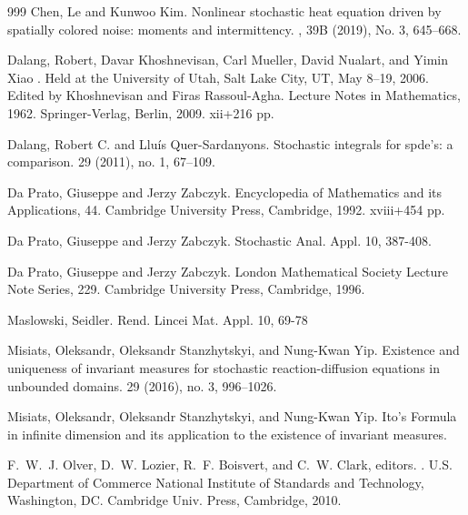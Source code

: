 \documentclass[a4paper,11pt]{article}
\numberwithin{equation}{section}
\theoremstyle{plain}
\theoremstyle{definition}
\begin{document}
\begin{small}
\begin{thebibliography}{999}
Chen, Le and Kunwoo Kim.
\newblock Nonlinear stochastic heat equation driven by spatially colored noise: moments and intermittency.
, 39B (2019), No. 3, 645--668.

 Dalang, Robert, Davar Khoshnevisan, Carl 
Mueller, David Nualart, and Yimin Xiao
.
\newblock Held at the University of Utah, Salt Lake City, UT, May 8–19, 2006. 
Edited by  Khoshnevisan and Firas Rassoul-Agha. Lecture Notes in Mathematics, 
1962.  
\newblock Springer-Verlag, Berlin, 2009. xii+216 pp.

Dalang, Robert C. and Llu\'is Quer-Sardanyons.
\newblock Stochastic integrals for spde's: a comparison.
 29 (2011), no. 1, 67--109. 

Da Prato, Giuseppe and Jerzy Zabczyk.
Encyclopedia of Mathematics and its Applications, 44. Cambridge University Press, Cambridge, 1992. xviii+454 pp.

Da Prato, Giuseppe and Jerzy Zabczyk.
Stochastic Anal. Appl. 10, 387-408.


Da Prato, Giuseppe and Jerzy Zabczyk.
\newblock London Mathematical Society Lecture Note Series, 229. Cambridge University Press, Cambridge, 1996.

Maslowski, Seidler.
\newblock Rend. Lincei Mat. Appl. 10, 69-78
	
Misiats, Oleksandr, Oleksandr Stanzhytskyi, and Nung-Kwan Yip.
\newblock Existence and uniqueness of invariant measures for stochastic reaction-diffusion equations in unbounded domains. 
 29 (2016), no. 3, 996--1026.

	
Misiats, Oleksandr, Oleksandr Stanzhytskyi, and Nung-Kwan Yip.
\newblock Ito's Formula in infinite dimension and its application to the existence of invariant measures. 

F.~W.~J. Olver, D.~W. Lozier, R.~F. Boisvert, and C.~W. Clark, editors.
.
\newblock U.S. Department of Commerce National Institute of Standards  and Technology, Washington, DC. Cambridge Univ. Press, Cambridge, 2010.


\end{thebibliography}
\end{small}
\end{document}
